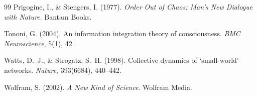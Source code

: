 \documentclass[12pt,a4paper]{article}
\begin{document}
\begin{thebibliography}{99}
Prigogine, I., \& Stengers, I. (1977).
\textit{Order Out of Chaos: Man's New Dialogue with Nature}.
Bantam Books.

Tononi, G. (2004).
An information integration theory of consciousness.
\textit{BMC Neuroscience}, 5(1), 42.

Watts, D.~J., \& Strogatz, S.~H. (1998).
Collective dynamics of `small-world' networks.
\textit{Nature}, 393(6684), 440--442.

Wolfram, S. (2002).
\textit{A New Kind of Science}.
Wolfram Media.

\end{thebibliography}
\end{document}
